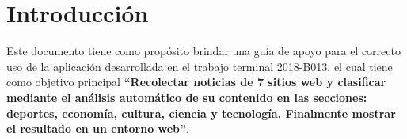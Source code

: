 \section{Introducción}

Este documento tiene como propósito brindar una guía de apoyo para el correcto uso de la aplicación desarrollada en el trabajo terminal 2018-B013, el cual tiene como objetivo principal \textbf{``Recolectar noticias de 7 sitios web y clasificar mediante el análisis automático de su contenido en las secciones: deportes, economía, cultura, ciencia y tecnología. Finalmente mostrar el resultado en un entorno web''}.


